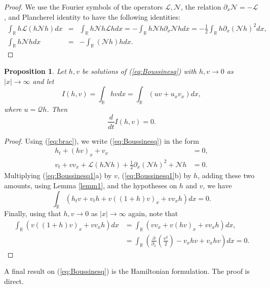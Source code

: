 \documentclass[final,11pt,a4paper,reqno]{amsart}
\newcommand{\RR}{\mathbb R}
\newtheorem{prop}[satz]{Proposition}
\theoremstyle{definition}
\begin{document}
\begin{proof}
We use the Fourier symbols of the operators $\mathscr{L}, \mathscr{N}$, the relation $\partial_{x}\mathscr{N}=-\mathscr{L}$, and Plancherel identity to have
the following identities:
\begin{eqnarray*}
\int_{\RR}h\mathscr{L}\left(h\mathscr{N}h\right)dx&=&\int_{\RR}h\mathscr{N}h\mathscr{L}h dx=-\int_{\RR}h\mathscr{N}h\partial_{x}\mathscr{N}h dx=-\frac{1}{2}\int_{\RR}h\partial_{x}\left(\mathscr{N}h\right)^{2}dx,\\
\int_{\RR}h\mathscr{N}hdx&=&-\int_{\RR}\left(\mathscr{N}h\right)hdx.
\end{eqnarray*}
\end{proof}
\begin{prop}
Let $h, v$ be solutions of (\ref{eq:Boussinesq}) with $h,v\rightarrow 0$ as $|x|\rightarrow\infty$ and let
\begin{equation}\label{eq:conserved1}
I(h,v)=\int_{\RR}hvdx=\int_{\RR} (uv+u_{x}v_{x})dx,
\end{equation}
where $u=\mathscr{Q}h$. Then
$$\frac{d}{dt} I(h,v)=0.$$
\end{prop}
\begin{proof}
Using (\ref{eq:brac}), we write (\ref{eq:Boussinesq}) in the form
\begin{subequations}\label{eq:Boussinesq1}
\begin{align}
h_t+(hv)_x+v_x&=0,\\
v_t+vv_x+\mathscr{L}\left(h\mathscr{N}h\right)+\frac{1}{2}\partial_{x}\left(\mathscr{N}h\right)^{2}+\mathscr{N}h&=0.
\end{align}
\end{subequations}
Multiplying (\ref{eq:Boussinesq1}a) by $v$,  (\ref{eq:Boussinesq1}b) by $h$, adding these two amounts, using Lemma \ref{lemm1}, and the hypotheses on $h$ and $v$, we have
$$
\int_{\RR}\left(h_{t}v+v_{t}h+v((1+h)v)_{x}+vv_{x}h\right)dx=0.
$$ Finally, using that $h,v\rightarrow 0$ as $|x|\rightarrow\infty$ again, note that
\begin{subequations}
\begin{align}
\int_{\RR}\left(v((1+h)v)_{x}+vv_{x}h\right)dx&= \int_{\RR}\left(vv_{x}+v(hv)_{x}+vv_{x}h\right)dx,\nonumber\\
&=\int_{\RR}\left(\frac{\partial}{\partial_{x}}\left(\frac{v^{2}}{2}\right)-v_{x}hv+v_{x}hv\right)dx=0.\nonumber
\end{align}
\end{subequations}
\end{proof}
A final result on (\ref{eq:Boussinesq}) is the Hamiltonian formulation. The proof is direct.
\end{document}

